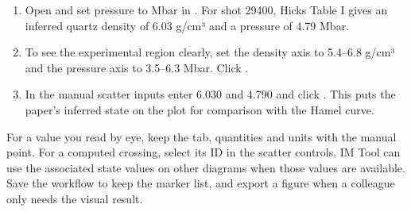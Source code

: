 \begin{enumerate}
\item Open  and set pressure to Mbar in . For shot 29400, Hicks Table I gives an inferred quartz density of 6.03 g/cm³ and a pressure of 4.79 Mbar.
\item To see the experimental region clearly, set the density axis to 5.4–6.8 g/cm³ and the pressure axis to 3.5–6.3 Mbar. Click .
\item In the manual scatter inputs enter 6.030 and 4.790 and click . This puts the paper's inferred state on the plot for comparison with the Hamel curve.
\end{enumerate}
For a value you read by eye, keep the tab, quantities and units with the manual point. For a computed crossing, select its ID in the scatter controls. IM Tool can use the associated state values on other diagrams when those values are available. Save the workflow to keep the marker list, and export a figure when a colleague only needs the visual result.
